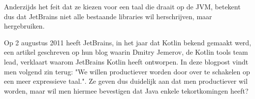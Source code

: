 Anderzijds het feit dat ze kiezen voor een taal die draait op de JVM, betekent dus dat JetBrains niet alle bestaande libraries wil herschrijven, maar hergebruiken.

Op 2 augustus 2011 heeft JetBrains, in het jaar dat Kotlin bekend gemaakt werd, een artikel geschreven op hun blog \textcite{JetBrainsNeedKotlin} waarin Dmitry Jemerov, de Kotlin tools team lead, verklaart waarom JetBrains Kotlin heeft ontworpen. In deze blogpost vindt men volgend zin terug: "We willen productiever worden door over te schakelen op een meer expressieve taal.". Ze geven dus duidelijk aan dat men productiever wil worden, maar wil men hiermee bevestigen dat Java enkele tekortkomingen heeft?




